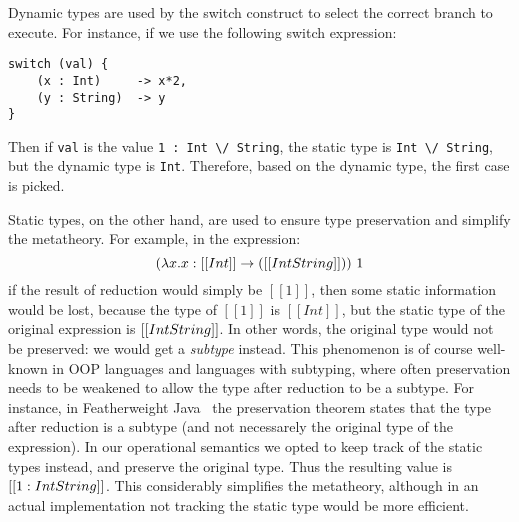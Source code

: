 Dynamic types are used by the switch construct
to select the correct branch to execute.
For instance, if we use the following switch expression:

\begin{lstlisting}
switch (val) {
    (x : Int)     -> x*2,
    (y : String)  -> y
}
\end{lstlisting}

\noindent Then if \lstinline{val} is the value \lstinline{1 : Int \/ String},
the static type is \lstinline{Int \/ String}, but the dynamic
type is \lstinline{Int}. Therefore, based on the dynamic type,
the first case is picked.

Static types, on the other hand, are used to ensure type preservation
and simplify the metatheory.
For example, in the expression:
%
\[(\lambda x . x : [[Int]] \to ([[Int \/ String]]))~1\]
%
\noindent if the result of reduction would simply be $[[1]]$, then some
static information would be lost, because the type of $[[1]]$ is $[[Int]]$,
but the static type of the original expression is $[[Int \/ String]]$.
In other words, the original type would not be preserved: we
would get a \emph{subtype} instead. This phenomenon is of course well-known
in OOP languages and languages with subtyping, where often preservation
needs to be weakened to allow the type after reduction to be a subtype.
For instance, in Featherweight Java~\cite{DBLP:journals/toplas/IgarashiPW01}
the preservation theorem states that the type after reduction is a
subtype (and not necessarely the original type of the expression). In our
operational semantics we opted to keep track of the static types instead,
and preserve the original type. Thus the resulting value is $[[1 : Int \/ String]]$.
This considerably simplifies the metatheory, although in an actual
implementation not tracking the static type would be more efficient.



